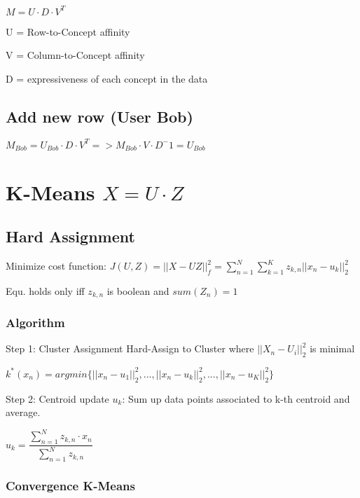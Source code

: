 \documentclass[11pt,twocolumn]{article}
\begin{document}
$M = U \cdot D \cdot V^T$

U = Row-to-Concept affinity

V = Column-to-Concept affinity

D = expressiveness of each concept in the data

\subsection{Add new row (User Bob)}

$M_{Bob} = U_{Bob} \cdot D \cdot V^T => M_{Bob} \cdot V \cdot D^-1 = U_{Bob}$


\section{K-Means $X = U \cdot Z$}


\subsection{Hard Assignment}

Minimize cost function:
$J(U,Z) = || X - UZ ||^2_f = \sum_{n=1}^{N}{\sum_{k=1}^{K}{z_{k,n} ||x_n - u_k||_2^2}}$


Equ. holds only iff $z_{k,n}$ is boolean and $sum(Z_n) = 1$

\subsubsection{Algorithm}

Step 1: Cluster Assignment
Hard-Assign to Cluster where
$ || X_n - U_i ||^2_2$ is minimal

\footnotesize

$ k^*(x_n) = argmin \lbrace ||x_n-u_1||_2^2,...,||x_n-u_k||_2^2,...,||x_n-u_K||_2^2 \rbrace$
\normalsize

Step 2: Centroid update $u_k$: 
Sum up data points associated to k-th centroid and average.

$u_k = \dfrac{\sum_{n=1}^N{z_{k,n} \cdot x_n}}{\sum_{n=1}^N{z_{k,n}}} $

\subsubsection{Convergence K-Means}
\end{document}
